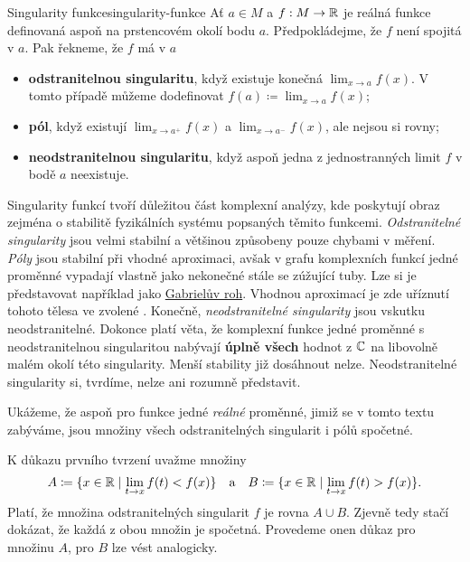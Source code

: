 \begin{example}{Singularity funkce}{singularity-funkce}
 Ať $a \in M$ a $f:M \to \mathbb{R}$ je reálná funkce definovaná aspoň na prstencovém
 okolí bodu $a$. Předpokládejme, že $f$ není spojitá v $a$. Pak řekneme, že $f$
 má v $a$
 \begin{itemize}
  \item \textbf{odstranitelnou singularitu}, když existuje konečná
   $\lim_{x \to a} f(x)$. V tomto případě můžeme dodefinovat $f(a) \coloneqq
   \lim_{x \to a} f(x)$;
  \item \textbf{pól}, když existují $\lim_{x \to a^{+}} f(x)$ a
   $\lim_{x \to a^{-}} f(x)$, ale nejsou si rovny;
  \item \textbf{neodstranitelnou singularitu}, když aspoň jedna z jednostranných
   limit $f$ v bodě $a$ neexistuje.
 \end{itemize}
 Singularity funkcí tvoří důležitou část komplexní analýzy, kde poskytují obraz
 zejména o stabilitě fyzikálních systému popsaných těmito funkcemi.
 \emph{Odstranitelné singularity} jsou velmi stabilní a většinou způsobeny pouze
 chybami v měření. \emph{Póly} jsou stabilní při vhodné aproximaci, avšak v
 grafu komplexních funkcí jedné proměnné vypadají vlastně jako nekonečné stále
 se zúžující tuby. Lze si je představovat například jako
 \href{https://cs.wikipedia.org/wiki/Gabriel%C5%AFv_roh}{Gabrielův roh}. Vhodnou
  aproximací je zde uříznutí tohoto tělesa ve zvolené . Konečně,
  \emph{neodstranitelné singularity} jsou vskutku neodstranitelné. Dokonce platí
  věta, že komplexní funkce jedné proměnné s neodstranitelnou singularitou
  nabývají \textbf{úplně všech} hodnot z $\mathbb{C}$ na libovolně malém okolí této
  singularity. Menší stability již dosáhnout nelze. Neodstranitelné singularity
  si, tvrdíme, nelze ani rozumně představit.

 Ukážeme, že aspoň pro funkce jedné \emph{reálné} proměnné, jimiž se v tomto
 textu zabýváme, jsou množiny všech odstranitelných singularit i pólů spočetné.

 K důkazu prvního tvrzení uvažme množiny
 \[
  A \coloneqq \{x \in \mathbb{R} \mid \lim_{t \to x} f(t) < f(x)\} \quad \text{a} \quad
  B \coloneqq \{x \in \mathbb{R} \mid \lim_{t \to x} f(t) > f(x)\}.
 \]
 Platí, že množina odstranitelných singularit $f$ je rovna $A \cup B$. Zjevně
 tedy stačí dokázat, že každá z obou množin je spočetná. Provedeme onen důkaz
 pro množinu $A$, pro $B$ lze vést analogicky.


\end{example}
